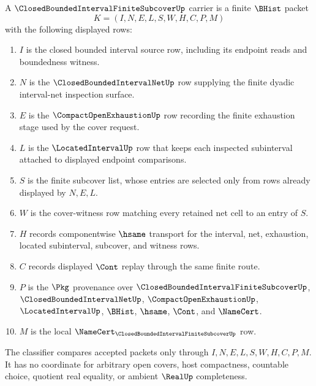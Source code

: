 \begin{definition}
\label{def:closed-bounded-interval-finite-subcover-carrier}
A $\ClosedBoundedIntervalFiniteSubcoverUp$ carrier is a finite $\BHist$ packet
$$
K=(I,N,E,L,S,W,H,C,P,M)
$$
with the following displayed rows:
\begin{enumerate}
\item $I$ is the closed bounded interval source row, including its endpoint reads and boundedness witness.
\item $N$ is the $\ClosedBoundedIntervalNetUp$ row supplying the finite dyadic interval-net inspection surface.
\item $E$ is the $\CompactOpenExhaustionUp$ row recording the finite exhaustion stage used by the cover request.
\item $L$ is the $\LocatedIntervalUp$ row that keeps each inspected subinterval attached to displayed endpoint comparisons.
\item $S$ is the finite subcover list, whose entries are selected only from rows already displayed by $N,E,L$.
\item $W$ is the cover-witness row matching every retained net cell to an entry of $S$.
\item $H$ records componentwise $\hsame$ transport for the interval, net, exhaustion, located subinterval, subcover, and witness rows.
\item $C$ records displayed $\Cont$ replay through the same finite route.
\item $P$ is the $\Pkg$ provenance over $\ClosedBoundedIntervalFiniteSubcoverUp$, $\ClosedBoundedIntervalNetUp$, $\CompactOpenExhaustionUp$, $\LocatedIntervalUp$, $\BHist$, $\hsame$, $\Cont$, and $\NameCert$.
\item $M$ is the local $\NameCert_{\ClosedBoundedIntervalFiniteSubcoverUp}$ row.
\end{enumerate}
The classifier compares accepted packets only through $I,N,E,L,S,W,H,C,P,M$. It has no coordinate for arbitrary open covers, host compactness, countable choice, quotient real equality, or ambient $\RealUp$ completeness.
\end{definition}

